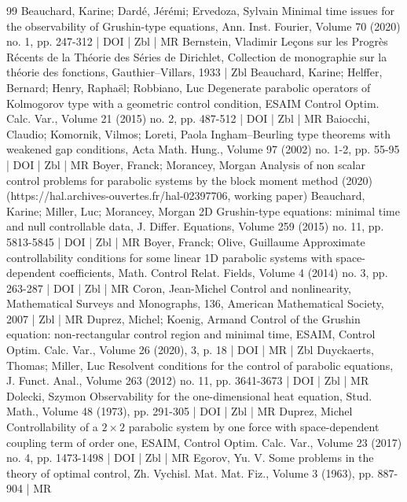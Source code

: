 \documentclass[10pt]{amsart}
\theoremstyle{definition}\newtheorem{defi}[theo]{Definition}\newtheorem{rema}[theo]{Remark}\newtheorem{exam}[theo]{Example}\newtheorem{exem}[theo]{Example}\newtheorem{nota}[theo]{Notation}
\begin{document}
\begin{thebibliography}{99}
Beauchard, Karine; Dardé, Jérémi; Ervedoza, Sylvain Minimal time issues for the observability of Grushin-type equations, Ann. Inst. Fourier, Volume 70 (2020) no. 1, pp. 247-312 | DOI | Zbl | MR
Bernstein, Vladimir Leçons sur les Progrès Récents de la Théorie des Séries de Dirichlet, Collection de monographie sur la théorie des fonctions, Gauthier–Villars, 1933 | Zbl
Beauchard, Karine; Helffer, Bernard; Henry, Raphaël; Robbiano, Luc Degenerate parabolic operators of Kolmogorov type with a geometric control condition, ESAIM Control Optim. Calc. Var., Volume 21 (2015) no. 2, pp. 487-512 | DOI | Zbl | MR
Baiocchi, Claudio; Komornik, Vilmos; Loreti, Paola Ingham–Beurling type theorems with weakened gap conditions, Acta Math. Hung., Volume 97 (2002) no. 1-2, pp. 55-95 | DOI | Zbl | MR
Boyer, Franck; Morancey, Morgan Analysis of non scalar control problems for parabolic systems by the block moment method (2020) (https://hal.archives-ouvertes.fr/hal-02397706, working paper)
Beauchard, Karine; Miller, Luc; Morancey, Morgan 2D Grushin-type equations: minimal time and null controllable data, J. Differ. Equations, Volume 259 (2015) no. 11, pp. 5813-5845 | DOI | Zbl | MR
Boyer, Franck; Olive, Guillaume Approximate controllability conditions for some linear 1D parabolic systems with space-dependent coefficients, Math. Control Relat. Fields, Volume 4 (2014) no. 3, pp. 263-287 | DOI | Zbl | MR
Coron, Jean-Michel Control and nonlinearity, Mathematical Surveys and Monographs, 136, American Mathematical Society, 2007 | Zbl | MR
Duprez, Michel; Koenig, Armand Control of the Grushin equation: non-rectangular control region and minimal time, ESAIM, Control Optim. Calc. Var., Volume 26 (2020), 3, p. 18 | DOI | MR | Zbl
Duyckaerts, Thomas; Miller, Luc Resolvent conditions for the control of parabolic equations, J. Funct. Anal., Volume 263 (2012) no. 11, pp. 3641-3673 | DOI | Zbl | MR
Dolecki, Szymon Observability for the one-dimensional heat equation, Stud. Math., Volume 48 (1973), pp. 291-305 | DOI | Zbl | MR
Duprez, Michel Controllability of a $2\times 2$ parabolic system by one force with space-dependent coupling term of order one, ESAIM, Control Optim. Calc. Var., Volume 23 (2017) no. 4, pp. 1473-1498 | DOI | Zbl | MR
Egorov, Yu. V. Some problems in the theory of optimal control, Zh. Vychisl. Mat. Mat. Fiz., Volume 3 (1963), pp. 887-904 | MR

\end{thebibliography}
\end{document}
